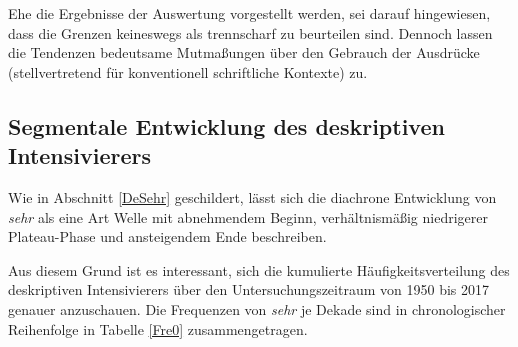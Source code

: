 Ehe die Ergebnisse der Auswertung vorgestellt werden, sei darauf hingewiesen, dass die Grenzen keineswegs als trennscharf zu beurteilen sind. Dennoch lassen die Tendenzen bedeutsame Mutmaßungen über den Gebrauch der Ausdrücke (stellvertretend für konventionell schriftliche Kontexte) zu.

\subsection[Segmentale Entwicklung des deskriptiven Intensivierers]{Segmentale Entwicklung des deskriptiven Intensivierers}
Wie in Abschnitt \ref{DeSehr} geschildert, lässt sich die diachrone Entwicklung von \textit{sehr} als eine Art Welle mit abnehmendem Beginn, verhältnismäßig niedrigerer Plateau-Phase und ansteigendem Ende beschreiben.

Aus diesem Grund ist es interessant, sich die kumulierte Häufigkeitsverteilung des deskriptiven Intensivierers über den Untersuchungszeitraum von 1950 bis 2017 genauer anzuschauen. Die Frequenzen von \textit{sehr} je Dekade sind in chronologischer Reihenfolge in Tabelle \ref{Fre0} zusammengetragen.


\begin{table}
\caption[Kumulierte Häufigkeitsverteilung des deskriptiven Intensivierers im Zeitraum von 1950 bis 2017]{Kumulierte Häufigkeitsverteilung des deskriptiven Intensivierers \textit{sehr} im Zeitraum von 1950 bis 2017 (in chronologischer Reihenfolge).}
\label{Fre0}
\end{table}

